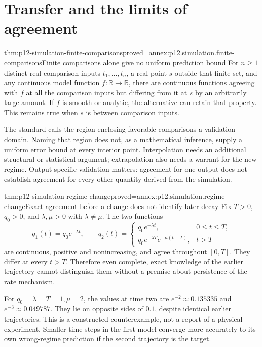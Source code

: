 \section{Transfer and the limits of agreement}

\begin{hbtheorem}{thm:p12-simulation-finite-comparisons}{proved=annex:p12.simulation.finite-comparisons}{Finite comparisons alone give no uniform prediction bound}
For \(n\geq1\) distinct real comparison inputs \(t_1,\ldots,t_n\),
a real point \(s\) outside that finite set, and any continuous model
function \(f:\mathbb R\to\mathbb R\), there are continuous functions agreeing with \(f\)
at all the comparison inputs but differing from it at \(s\) by
an arbitrarily large amount. If \(f\) is smooth or analytic, the
alternative can retain that property. This remains true when
\(s\) is between comparison inputs.
\end{hbtheorem}

The standard calls the region enclosing favorable comparisons a
validation domain. Naming that region does not, as a mathematical
inference, supply a uniform error bound at every interior point.
Interpolation needs an additional structural or statistical argument;
extrapolation also needs a warrant for the new regime. Output-specific
validation matters: agreement for one output does not establish
agreement for every other quantity derived from the simulation.
\cite[Sections 3.2 and E.3.4]{NASA7009B2024}

\begin{hbtheorem}{thm:p12-simulation-regime-change}{proved=annex:p12.simulation.regime-change}{Exact agreement before a change does not identify later decay}
Fix \(T>0\), \(q_0>0\), and \(\lambda,\mu>0\) with
\(\lambda\ne\mu\). The two functions
\[
 q_1(t)=q_0e^{-\lambda t},\qquad
 q_2(t)=
 \begin{cases}
 q_0e^{-\lambda t},&0\leq t\leq T,\\
 q_0e^{-\lambda T}e^{-\mu(t-T)},&t>T
 \end{cases}
\]
are continuous, positive and nonincreasing, and agree throughout
\([0,T]\). They differ at every \(t>T\). Therefore even complete,
exact knowledge of the earlier trajectory cannot distinguish them
without a premise about persistence of the rate mechanism.
\end{hbtheorem}

For \(q_0=\lambda=T=1,\mu=2\), the values at time two are
\(e^{-2}\approx0.135335\) and \(e^{-3}\approx0.049787\).
They lie on opposite sides of \(0.1\), despite identical earlier
trajectories. This is a constructed counterexample, not a report of
a physical experiment. Smaller time steps in the first model
converge more accurately to its own wrong-regime prediction if the
second trajectory is the target.

